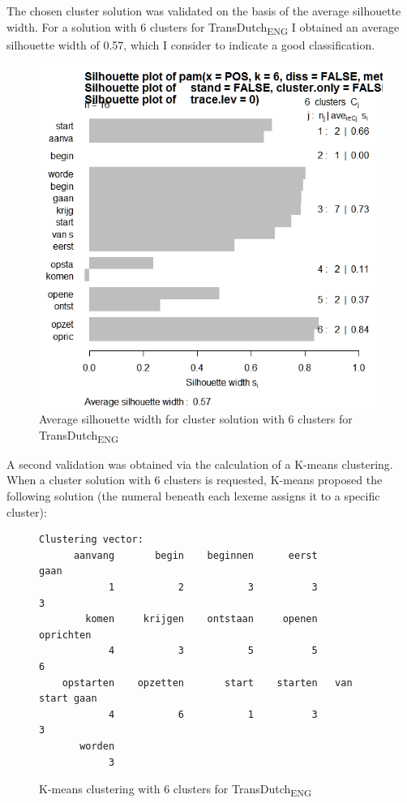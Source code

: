 The chosen cluster solution was validated on the basis of the average silhouette width. For a solution with 6 clusters for TransDutch\textsubscript{ENG} I obtained an average silhouette width of 0.57, which I consider to indicate a good classification.

\begin{figure}
\includegraphics[height=.4\textheight]{figures/Vandevoorde2-img66.png}
\caption{\label{fig:4:65}  Average silhouette width for cluster solution with 6 clusters for TransDutch\textsubscript{ENG}}
\end{figure}

A second validation was obtained via the calculation of a K-means clustering. When a cluster solution with 6 clusters is requested, K-means proposed the following solution (the numeral beneath each lexeme assigns it to a specific cluster):

\begin{figure}
\footnotesize
\begin{lstlisting}
Clustering vector:
      aanvang       begin    beginnen      eerst             gaan 
            1           2           3          3                3         
        komen     krijgen    ontstaan     openen        oprichten         
            4           3           5          5                6         
    opstarten    opzetten       start    starten   van start gaan         
            4           6           1          3                3         
       worden                                            
            3                                      
\end{lstlisting}                                   
 

\caption{\label{fig:4:66}  K-means clustering with 6 clusters for TransDutch\textsubscript{ENG}}
\end{figure}


